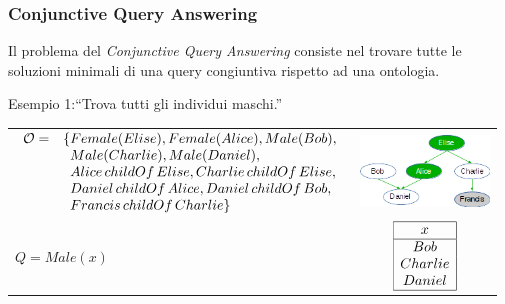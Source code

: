 \documentclass[8pt]{beamer}
\begin{document}
\begin{frame}
\frametitle{Conjunctive Query Answering}
Il problema del \emph{Conjunctive Query Answering} consiste nel trovare
tutte le soluzioni minimali di una query congiuntiva rispetto ad una ontologia.
\vspace{\baselineskip}

\begin{center}
Esempio 1:``Trova tutti gli individui maschi.'' 
\end{center}

\begin{tabular}{lc}
$\begin{array}{cl}
  \Ont  =  &  \{Female(Elise),  Female(Alice), Male(Bob), \\
  &\phantom{\{}Male(Charlie), Male(Daniel), \\
  &\phantom{\{}Alice\,childOf\,Elise, Charlie\,childOf\,Elise, \\
  &\phantom{\{}Daniel\,childOf\,Alice, Daniel\,childOf\,Bob, \\
  &\phantom{\{}Francis\,childOf\,Charlie \}\\
\end{array}$ &   \includegraphics[width=130px]{family.png} \\
 $Q=Male(x)$ &
 $\begin{array}{|c|}
  \hline
  x\\
  \hline
  Bob\\
  Charlie\\
  Daniel\\
  \hline
\end{array}$ \\
\end{tabular}
\end{frame}
\end{document}
